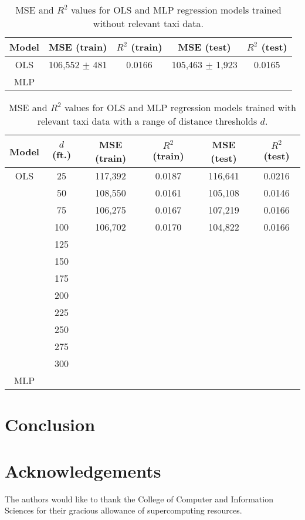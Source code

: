 \documentclass[useAMS, referee, usenatbib]{biom}
\begin{document}
\begin{table}
\caption{MSE and $R^2$ values for OLS and MLP regression models trained without relevant taxi data.}
\label{t:baseline_performance}
\begin{center}
 \begin{tabular}{||c|c|c|c|c||}
 \hline
 Model & MSE (train) & $R^2$ (train) & MSE (test) & $R^2$ (test) \\
 \hline
 OLS & 106,552 $\pm$ 481 & 0.0166 & 105,463 $\pm$ 1,923 & 0.0165 \\
 MLP &  &  \\
 \hline
\end{tabular}
\end{center}
\end{table}

\begin{table}
\caption{MSE and $R^2$ values for OLS and MLP regression models trained with relevant taxi data with a range of distance thresholds $d$.}
\label{t:taxi_performance}
\begin{center}
 \begin{tabular}{||c|c|c|c|c|c||}
 \hline
 Model & $d$ (ft.) & MSE (train) & $R^2$ (train) & MSE (test) & $R^2$ (test) \\
 \hline
 OLS & 25 & 117,392 & 0.0187 & 116,641 & 0.0216 \\
  & 50 & 108,550 & 0.0161 & 105,108 & 0.0146 \\
  & 75 & 106,275 & 0.0167 & 107,219 & 0.0166 \\
  & 100 & 106,702 & 0.0170 & 104,822 & 0.0166 \\
  & 125 &  &  &  &  \\
  & 150 &  &  &  &  \\
  & 175 &  &  &  &  \\
  & 200 &  &  &  &  \\
  & 225 &  &  &  &  \\
  & 250 &  &  &  &  \\
  & 275 &  &  &  &  \\
  & 300 &  &  &  &  \\
 MLP &  &  &  &  &  \\
 \hline
\end{tabular}
\end{center}
\end{table}

\section{Conclusion}
\label{s:conclusion}

\backmatter

\section*{Acknowledgements}

The authors would like to thank the College of Computer and Information Sciences for their gracious allowance of supercomputing resources.

 


\label{lastpage}
\end{document}
